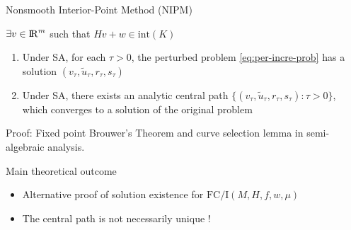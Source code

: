 \begin{frame}{Nonsmooth Interior-Point Method (NIPM)}

     \quad $\exists v \in \mathrm{I\!R}^m$ \quad such that \quad $Hv+w \in \mbox{int}({K})$
    \begin{theorem}
        \vspace{-5pt}
        \begin{enumerate}
            \item Under SA, for each $\tau > 0$, the perturbed problem \eqref{eq:per-incre-prob} has a solution $(v_\tau,\tilde{u}_\tau,r_\tau,s_\tau)$ \\[6pt]
            \item Under SA, there exists an analytic central path $\{(v_\tau,\tilde{u}_\tau,r_\tau,s_\tau): \tau>0\}$, which converges to a solution of the original problem
        \end{enumerate}
      \end{theorem}
      Proof: Fixed point  Brouwer's Theorem and curve selection lemma in semi-algebraic analysis.
      
      \begin{block}{Main theoretical outcome}
        \begin{itemize}
        \item Alternative proof of solution existence for $\mathrm{FC/I}(M,H,f,w,\mu)$
        \item  The central path is not necessarily unique !
        \end{itemize}
      \end{block}
\end{frame}


